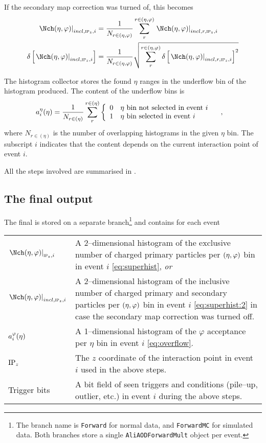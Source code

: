 If the secondary map correction was turned of, this becomes 
\begin{align}
  \label{eq:superhist:2}
  \dndetadphi[incl,\subIPz,i] &=
  \frac{1}{N_{r\in\etaphi}}\sum_{r}^{r\in\etaphi}  
  \dndetadphi[incl,r,\subIPz,i]\\
  \delta\left[\dndetadphi[incl,\subIPz,i]\right] &=
  \frac{1}{N_{r\in\etaphi}}\sqrt{\sum_{r}^{r\in\etaphi}   
    \delta\left[\dndetadphi[incl,r,\subIPz,i]\right]^2}
\end{align}

The histogram collector stores the found $\eta$ ranges in the
underflow bin of the histogram produced.  The content of the underflow
bins is %
\begin{align}
  \label{eq:underflow}
  a_i^{\eta}(\eta) &= 
  \frac{1}{N_{r\in(\eta)}}
  \sum_{r}^{r\in(\eta)} \left\{\begin{array}{cl} 
      0 & \eta \text{\ bin not selected in event $i$}\\ 
      1 & \eta \text{\ bin selected in event $i$}
      \end{array}\right.\quad,
\end{align}
where $N_{r\in(\eta)}$ is the number of overlapping histograms in the
given $\eta$ bin.  The subscript $i$ indicates that the content
depends on the current interaction point of event $i$.

All the steps involved are summarised in . 

\subsection{The final \AOD{} output} 

The final \FMD{} \AOD{} is stored on a separate branch\footnote{The
  branch name is \texttt{Forward} for normal data, and
  \texttt{ForwardMC} for simulated data. Both branches store a single
  \texttt{AliAODForwardMult} object per event.} and contains for each
event 

\begin{tabular}[T]{p{.2\linewidth}p{.76\linewidth}}
  $\dndetadphi[\subIPz,i]$ 
  & A 2--dimensional histogram of the
    exclusive number of charged primary
    particles per $(\eta,\varphi)$ bin in event $i$
    \eqref{eq:superhist}, \emph{or}\\ 
  $\dndetadphi[incl,\subIPz,i]$ 
  & A 2--dimensional histogram of the
    inclusive number of charged primary
    and secondary particles per
    $(\eta,\varphi)$ bin  in event $i$ \eqref{eq:superhist:2}
    in case the secondary map correction
    was turned off.\\   
  $a_i^{\varphi}(\eta){}$ 
  & A 1--dimensional histogram of the $\varphi$ acceptance
    per $\eta$ bin  in event $i$ \eqref{eq:overflow}. \\
  $\IPz$ 
  & The $z$ coordinate of the interaction point  in event $i$ used in the
    above steps.\\
  Trigger bits 
  & A bit field of seen triggers and conditions
    (pile--up, \SPD{} outlier, etc.) in event $i$ during the above steps.\\ 
\end{tabular}

